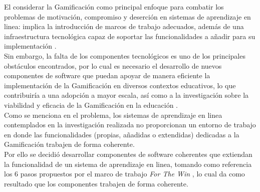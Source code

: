 \noindent El considerar la Gamificación como principal enfoque para combatir los problemas de motivación, compromiso y deserción en sistemas de aprendizaje en linea: implica la introducción de marcos de trabajo adecuados, además de una infraestructura tecnológica capaz de soportar las funcionalidades a añadir para su implementación \cite{mappingStudy}.\\
    
\noindent Sin embargo, la falta de los componentes tecnológicos es uno de los principales obstáculos encontrados, por lo cual es necesario el desarrollo de nuevos componentes de software que puedan apoyar de manera eficiente la implementación de la Gamificación en diversos contextos educativos, lo que contribuiría a una adopción a mayor escala, así como a la investigación sobre la viabilidad y eficacia de la Gamificación en la educación \cite{mappingStudy}.\\
    
    

\noindent Como se menciona en el problema, los sistemas de aprendizaje en linea contemplados en la investigación realizada no proporcionan un entorno de trabajo en donde las funcionalidades (propias, añadidas o extendidas) dedicadas a la Gamificación trabajen de forma coherente.\\
    
\noindent Por ello se decidió desarrollar componentes de software coherentes que extiendan la funcionalidad de un sistema de aprendizaje en linea, tomando como referencia los 6 pasos propuestos por el marco de trabajo {\it For The Win} \cite{FrameWorkForTheWin}, lo cual da como resultado que los componentes trabajen de forma coherente.
    
